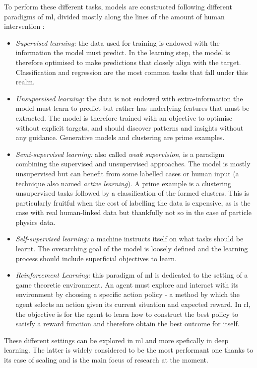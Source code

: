 To perform these different tasks, models are constructed following different paradigms of \gls{ml}, divided mostly along the lines of the amount of human intervention \cite{MurphyML}:
\begin{itemize}
    \item \textit{Supervised learning:} the data used for training is endowed with the information the model must predict. In the learning step, the model is therefore optimised to make predictions that closely align with the target. Classification and regression are the most common tasks that fall under this realm.
    \item \textit{Unsupervised learning:} the data is not endowed with extra-information the model must learn to predict but rather has underlying features that must be extracted. The model is therefore trained with an objective to optimise without explicit targets, and should discover patterns and insights without any guidance. Generative models and clustering are prime examples. 
    \item \textit{Semi-supervised learning:} also called \textit{weak supervision}, is a paradigm combining the supervised and unsupervised approaches. The model is mostly unsupervised but can benefit from some labelled cases or human input (a technique also named \textit{active learning}). A prime example is a clustering unsupervised tasks followed by a classification of the formed clusters. This is particularly fruitful when the cost of labelling the data is expensive, as is the case with real human-linked data but thankfully not so in the case of particle physics data.
    \item \textit{Self-supervised learning:} a machine instructs itself on what tasks should be learnt. The overarching goal of the model is loosely defined and the learning process should include superficial objectives to learn.
    \item \textit{Reinforcement Learning:} this paradigm of \gls{ml} is dedicated to the setting of a game theoretic environment. An agent must explore and interact with its environment by choosing a specific action policy - a method by which the agent selects an action given its current situation and expected reward. In \gls{rl}, the objective is for the agent to learn how to construct the best policy to satisfy a reward function and therefore obtain the best outcome for itself.
\end{itemize}

These different settings can be explored in \gls{ml} and more spefically in deep learning. The latter is widely considered to be the most performant one thanks to its ease of scaling and is the main focus of research at the moment.

